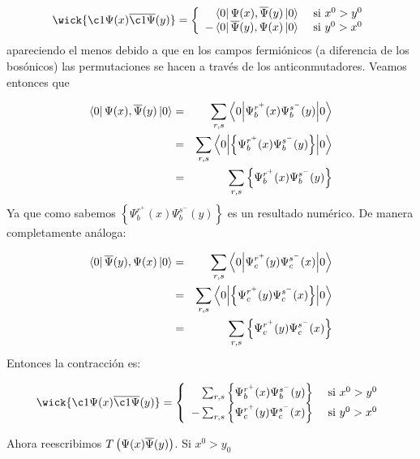 \begin{solucion}
	\begin{equation*}
		\wick{\c1{\Psi}(x)\overline{\c1{\Psi}}(y)} =\left\lbrace  \begin{array}{rl}
			\bra{0} \Psi (x), \aPsi (y) \ket{0} & \ \text{si} \ x^0>y^0 \\
			- \bra{0} \aPsi (y), \Psi (x)\ket{0} & \ \text{si} \ y^0>x^0 \\
		\end{array} \right.
	\end{equation*}
	apareciendo el menos debido a que en los campos fermiónicos (a diferencia de los bosónicos) las permutaciones se hacen a través de los anticonmutadores. Veamos entonces que 
	
	\begin{eqnarray*}
		\bra{0} \Psi (x), \aPsi (y) \ket{0}& = & \sum_{r,s} \ev**{  \Psi_b^{r^+} (x) \Psi_b^{s^-} (y) }{0} \\ & = & \sum_{r,s} \ev**{ \left\lbrace \Psi_b^{r^+} (x) \Psi_b^{s^-} (y) \right\rbrace  }{0} \\ & = &\sum_{r,s} \left\lbrace \Psi_b^{r^+} (x) \Psi_b^{s^-} (y) \right\rbrace 
	\end{eqnarray*}
	Ya que como sabemos $\left\lbrace \Psi_b^{r^+} (x) \Psi_b^{s^-} (y) \right\rbrace$ es un resultado numérico. De manera completamente análoga:
	
	\begin{eqnarray*}
		\bra{0} \aPsi (y), \Psi (x) \ket{0}& = & \sum_{r,s} \ev**{  \Psi_c^{r^+} (y) \Psi_c^{s^-} (x) }{0} \\ & = & \sum_{r,s} \ev**{ \left\lbrace \Psi_c^{r^+} (y) \Psi_c^{s^-} (x) \right\rbrace  }{0} \\ & = &\sum_{r,s} \left\lbrace \Psi_c^{r^+} (y) \Psi_c^{s^-} (x) \right\rbrace 
	\end{eqnarray*}	
	Entonces la contracción es:
	
	\begin{equation*}
		\wick{\c1{\Psi}(x)\overline{\c1{\Psi}}(y)} =\left\lbrace  \begin{array}{rl}
			\sum_{r,s} \left\lbrace \Psi_b^{r^+} (x) \Psi_b^{s^-} (y) \right\rbrace  & \ \text{si} \ x^0>y^0 \\
			- \sum_{r,s} \left\lbrace \Psi_c^{r^+} (y) \Psi_c^{s^-} (x) \right\rbrace  & \ \text{si} \ y^0>x^0 \\
		\end{array} \right.
	\end{equation*}
	
	Ahora reescribimos $ T \left(  \Psi(x) \overline{\Psi}(y)  \right)$. Si $x^0 > y_0$
	

\end{solucion}
